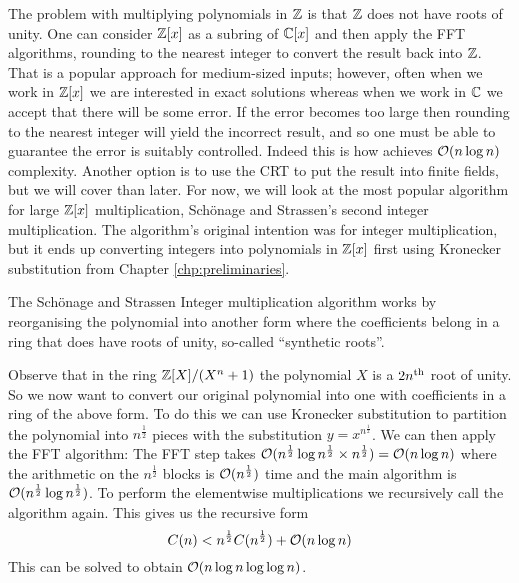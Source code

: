 The problem with multiplying polynomials in ${\mathbb Z}$ is that ${\mathbb Z}$ does not have roots of unity. One can consider ${\mathbb Z}[x]$ as a subring of $\mathbb{C}[x]$ and then apply the FFT algorithms, rounding to the nearest integer to convert the result back into ${\mathbb Z}$. That is a popular approach for medium-sized inputs; however, often when we work in ${\mathbb Z}[x]$ we are interested in exact solutions whereas when we work in $\mathbb{C}$ we accept that there will be some error. If the error becomes too large then rounding to the nearest integer will yield the incorrect result, and so one must be able to guarantee the error is suitably controlled. Indeed this is how \cite{nlogn} achieves $\mathcal O(n\log n)$ complexity. Another option is to use the CRT to put the result into finite fields, but we will cover than later. For now, we will look at the most popular algorithm for large ${\mathbb Z}[x]$ multiplication, Sch\"{o}nage and Strassen's second integer multiplication. The algorithm's original intention was for integer multiplication, but it ends up converting integers into polynomials in ${\mathbb Z}[x]$ first using Kronecker substitution from Chapter \ref{chp:preliminaries}.

The Sch\"{o}nage and Strassen Integer multiplication algorithm works by reorganising the polynomial into another form where the coefficients belong in a ring that does have roots of unity, so-called ``synthetic roots''.


Observe that in the ring ${\mathbb Z}[X] / (X^n + 1)$ the polynomial $X$ is a $2n^{\textrm{th}}$ root of unity. So we now want to convert our original polynomial into one with coefficients in a ring of the above form. To do this we can use Kronecker substitution to partition the polynomial into $n^{\frac{1}{2}}$ pieces with the substitution $y = x^{n^{\frac{1}{2}}}$. We can then apply the FFT algorithm: The FFT step takes $\mathcal O(n^{\frac{1}{2}}\log n^{\frac{1}{2}} \times n^{\frac{1}{2}}) = \mathcal O(n \log n)$ where the arithmetic on the $n^{\frac{1}{2}}$ blocks is $\mathcal O(n^{\frac{1}{2}})$ time and the main algorithm is $\mathcal O(n^{\frac{1}{2}}\log n^{\frac{1}{2}})$. To perform the elementwise multiplications we recursively call the algorithm again. This gives us the recursive form
\[
    C(n) < n^{\frac{1}{2}}C(n^{\frac{1}{2}}) + \mathcal O(n \log n)
\]
This can be solved to obtain $\mathcal O(n \log n \log \log n)$. 



